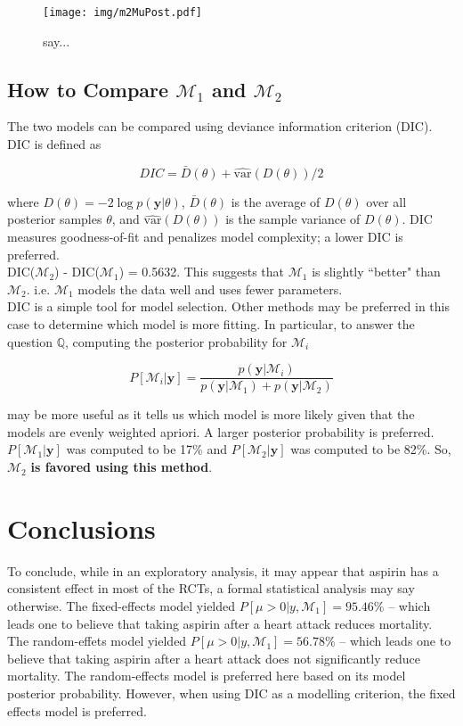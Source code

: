 \documentclass{../../tex_template/asaproc}
\newcommand{\p}[1]{\left(#1\right)}
\newcommand{\bk}[1]{\left[#1\right]}
\newcommand{\ds}{ \displaystyle }
\newcommand{\M}{\mathcal{M}}
\newcommand{\Q}{\mathbb{Q}}
\begin{document}
\begin{figure}%
  \texttt{[image: img/m2MuPost.pdf]}
  \caption{say...}
  \label{fig:m2MuPost}
\end{figure}

\subsection{How to Compare $\M_1$ and $\M_2$}
The two models can be compared using deviance information criterion (DIC).
DIC is defined as 

$$
DIC = \bar{D}(\theta) + \widehat{\text{var}}\p{D(\theta)} / 2
$$

where $D(\theta)= -2\log p(\bm y|\theta)$, $\bar{D}(\theta)$ is the average of
$D(\theta)$ over all posterior samples $\theta$, and
$\widehat{\text{var}}(D(\theta))$ is the sample variance of $D(\theta)$. DIC
measures goodness-of-fit and penalizes model complexity; a lower DIC is
preferred. \\

DIC($\M_2$) - DIC($\M_1$) = 0.5632. This suggests that $\M_1$ is slightly
``better" than $\M_2$. i.e. $\M_1$ models the data well and uses fewer
parameters.\\

DIC is a simple tool for model selection. Other methods may be preferred 
in this case to determine which model is more fitting. In particular,
to answer the question $\Q$, computing the posterior probability
for $\M_i$

$$
P\bk{\M_i|\bm y} = \ds\frac{p(\bm y|\M_i)}{p(\bm y|\M_1)+p(\bm y|\M_2)}
$$

may be more useful as it tells us which model is more likely given that the
models are evenly weighted apriori. A larger posterior probability is
preferred. $P\bk{\M_1|\bm y}$ was computed to be 17\% and $P\bk{\M_2|\bm y}$
was computed to be 82\%. So, $\M_2$ \textbf{is favored using this method}.\\


\section{Conclusions}
To conclude, while in an exploratory analysis, it may appear that aspirin has a
consistent effect in most of the RCTs, a formal statistical analysis may say
otherwise. The fixed-effects model yielded $P\bk{\mu > 0 | y, \M_1} = 95.46\%$
-- which leads one to believe that taking aspirin after a heart attack reduces
mortality. The random-effets model yielded $P\bk{\mu > 0 | y, \M_1} = 56.78\%$
-- which leads one to believe that taking aspirin after a heart attack does
not significantly reduce mortality. The random-effects model is preferred here
based on its model posterior probability. However, when using DIC as a
modelling criterion, the fixed effects model is preferred.
\end{document}
